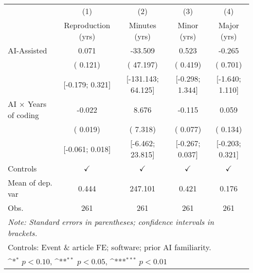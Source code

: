 \def\sym#1{\ifmmode^{#1}\else\(^{#1}\)\fi}
\begin{tabular}{l*{4}{c}}
\hline\hline
 & (1) & (2) & (3) & (4)
\\
 & Reproduction (yrs) & Minutes (yrs) & Minor (yrs) & Major (yrs)
 \\
\hline
AI-Assisted &  0.071 & -33.509 &  0.523 & -0.265
\\
 & ( 0.121) & ( 47.197) & ( 0.419) & ( 0.701)
\\
 & [-0.179;  0.321] & [-131.143;  64.125] & [-0.298;  1.344] & [-1.640;  1.110]
\\
AI × Years of coding & -0.022 &  8.676 & -0.115 &  0.059
\\
 & ( 0.019) & ( 7.318) & ( 0.077) & ( 0.134)
\\
 & [-0.061;  0.018] & [-6.462;  23.815] & [-0.267;  0.037] & [-0.203;  0.321]
\\
\hline
Controls & $\checkmark$ & $\checkmark$ & $\checkmark$ & $\checkmark$
\\
Mean of dep. var &  0.444 &  247.101 &  0.421 &  0.176
\\
Obs. & 261 & 261 & 261 & 261
\\
\hline
\hline\hline
\multicolumn{5}{l}{\it{Note:} Standard errors in parentheses; confidence intervals in brackets.}\\
\multicolumn{5}{l}{Controls: Event \& article FE; software; prior AI familiarity.}\\
\multicolumn{5}{l}{\sym{*} $p<0.10$, \sym{**} $p<0.05$,  \sym{***} $p<0.01$}\\
\end{tabular}
